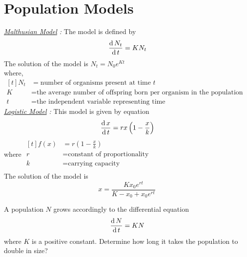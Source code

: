 \documentclass[../main-sheet.tex]{subfiles}
\begin{document}
\chapter{Population Models}
\emph{\underline{Malthusian Model} :} The model is defined by
\[\,\frac{\mathrm{d}\,N_t}{\mathrm{d}\,t}=KN_t\]
The solution of the model is \(N_t=N_0e^{Kt}\)\\
where, \(\begin{aligned}[t]
    N_t&=\text{number of organisms present at time }t\\
    K&=\text{the average number of offspring born per organism in the population per unit time}\\
    t&=\text{the independent variable representing time}
\end{aligned}\)\\


\noindent\emph{\underline{Logistic Model} :} This model is given by equation
\[\,\frac{\mathrm{d}\,x}{\mathrm{d}\,t}=rx\left( 1-\frac{x}{k} \right)\]
where \(\begin{aligned}[t]
    \displaystyle f(x)&=r\left( 1-\frac{x}{k} \right)\\
    r&=\text{constant of proportionality}\\
    k&=\text{carrying capacity}\\
\end{aligned}\)\\
The solution of the model is \[x=\frac{K x_0 e^{rt}}{K-x_0+x_0e^{rt}}\]
\begin{prob}
    A population \(N\) grows accordingly to the differential equation
    \[\,\frac{\mathrm{d}\,N}{\mathrm{d}\,t}=KN\]
    where \(K\) is a positive constant. Determine how long it takes the population to double in size?
\end{prob}
\end{document}
